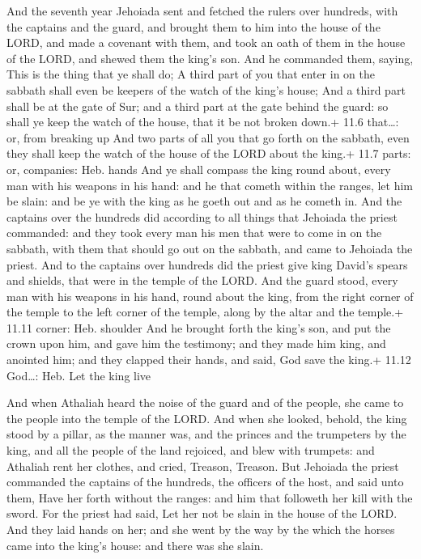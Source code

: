  And the seventh year Jehoiada sent and fetched the rulers
over hundreds, with the captains and the guard, and brought them to him
into the house of the LORD, and made a covenant with them, and took an
oath of them in the house of the LORD, and shewed them the king's son.
 And he commanded them, saying, This is the thing that ye
shall do; A third part of you that enter in on the sabbath shall even be
keepers of the watch of the king's house;  And a third part
shall be at the gate of Sur; and a third part at the gate behind the
guard: so shall ye keep the watch of the house, that it be not broken
down.+ 11.6 that\ldots: or, from breaking up  And two parts
of all you that go forth on the sabbath, even they shall keep the watch
of the house of the LORD about the king.+ 11.7 parts: or, companies:
Heb. hands  And ye shall compass the king round about, every
man with his weapons in his hand: and he that cometh within the ranges,
let him be slain: and be ye with the king as he goeth out and as he
cometh in.  And the captains over the hundreds did according
to all things that Jehoiada the priest commanded: and they took every
man his men that were to come in on the sabbath, with them that should
go out on the sabbath, and came to Jehoiada the priest. 
And to the captains over hundreds did the priest give king David's
spears and shields, that were in the temple of the LORD. 
And the guard stood, every man with his weapons in his hand, round about
the king, from the right corner of the temple to the left corner of the
temple, along by the altar and the temple.+ 11.11 corner: Heb. shoulder
 And he brought forth the king's son, and put the crown
upon him, and gave him the testimony; and they made him king, and
anointed him; and they clapped their hands, and said, God save the
king.+ 11.12 God\ldots: Heb. Let the king live

 And when Athaliah heard the noise of the guard and of
the people, she came to the people into the temple of the LORD.
 And when she looked, behold, the king stood by a pillar,
as the manner was, and the princes and the trumpeters by the king, and
all the people of the land rejoiced, and blew with trumpets: and
Athaliah rent her clothes, and cried, Treason, Treason. 
But Jehoiada the priest commanded the captains of the hundreds, the
officers of the host, and said unto them, Have her forth without the
ranges: and him that followeth her kill with the sword. For the priest
had said, Let her not be slain in the house of the LORD. 
And they laid hands on her; and she went by the way by the which the
horses came into the king's house: and there was she slain.

